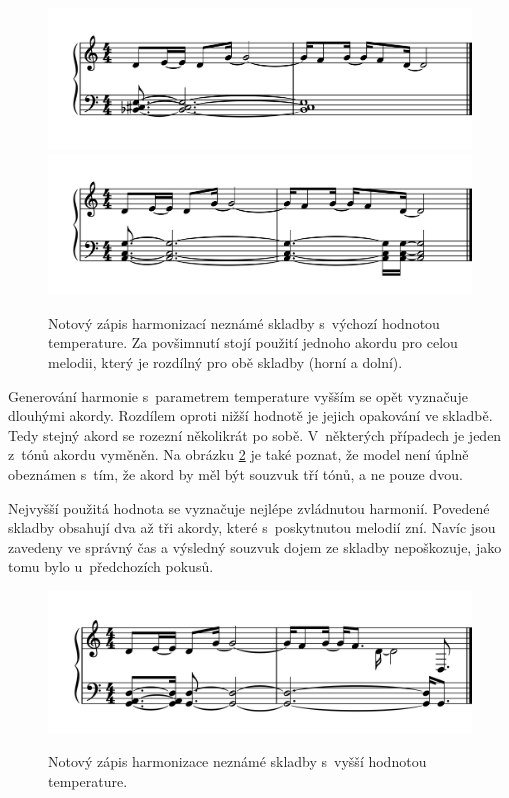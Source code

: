 \begin{figure}[h]\centering
    \centering
    \includegraphics[width=0.8\linewidth]{obrazky/MyHarmonyShortDefTmp01-1.png}\\[1pt]  
    \includegraphics[width=0.8\linewidth]{obrazky/MyHarmonyShortDefTmp03-1.png}\\[1pt]  
    \caption{Notový zápis harmonizací neznámé skladby s~výchozí hodnotou temperature.
    Za povšimnutí stojí použití jednoho akordu pro celou melodii, 
    který je rozdílný pro obě skladby (horní a dolní).}    
    \label{obrazekMyHarmonyShortNotyDefTemp}
\end{figure}
\par

Generování harmonie s~parametrem temperature vyšším se opět vyznačuje
dlouhými akordy.
Rozdílem oproti nižší hodnotě je jejich opakování ve skladbě.
Tedy stejný akord se rozezní několikrát po sobě.
V~některých případech je jeden z~tónů akordu vyměněn.
Na obrázku \ref{obrazekMyHarmonyShortNotyHighTemp} je také poznat,
že model není úplně obeznámen s~tím,
že akord by měl být souzvuk tří tónů, a ne pouze dvou.
\par
Nejvyšší použitá hodnota se vyznačuje nejlépe zvládnutou harmonií.
Povedené skladby obsahují dva až tři akordy,
které s~poskytnutou melodií zní.
Navíc jsou zavedeny ve správný čas 
a výsledný souzvuk dojem ze skladby nepoškozuje,
jako tomu bylo u~předchozích pokusů.

\begin{figure}[h]\centering
    \centering
    \includegraphics[width=0.8\linewidth]{obrazky/MyHarmonyShortHigherTmp-1.png}\\[1pt]  
    \caption{Notový zápis harmonizace neznámé skladby s~vyšší hodnotou temperature.}    
    \label{obrazekMyHarmonyShortNotyHighTemp}
\end{figure}
\par

